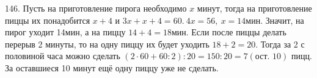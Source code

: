 146. Пусть на приготовление пирога необходимо $x$ минут, тогда на приготовление пиццы их понадобится $x+4$ и $3x+x+4=60.\ 4x=56,\ x=14$мин. Значит, на пирог уходит 14мин, а на пиццу $14+4=18$мин. Если после пиццы делать перерыв 2 минуты, то на одну пиццу их будет уходить $18+2=20.$ Тогда за 2 с половиной часа можно сделать $(2\cdot60+60:2):20=150:20=7 (\text{ост. 10})$ пицц. За оставшиеся 10 минут ещё одну пиццу уже не сделать.\\
